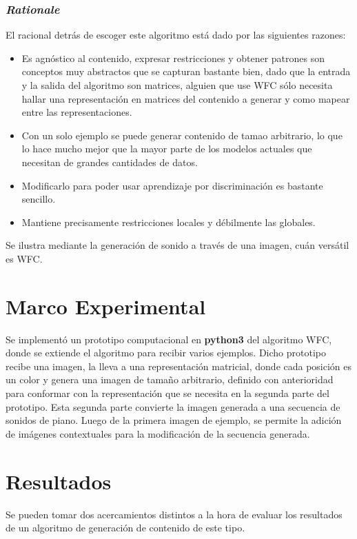 \documentclass[a4paper, 10pt]{article}
\begin{document}
	\subsubsection{\textit{Rationale}}
	El racional detrás de escoger este algoritmo está dado por las siguientes razones:
	\begin{itemize}
		\item Es agnóstico al contenido, expresar restricciones y obtener patrones son conceptos
			muy abstractos que se capturan bastante bien, dado que la entrada y la salida del algoritmo
			son matrices, alguien que use WFC sólo necesita hallar una representación en
			matrices del contenido a generar y como mapear entre las representaciones.
		\item Con un solo ejemplo se puede generar contenido de tamao arbitrario, lo que
			lo hace mucho mejor que la mayor parte de los modelos actuales que necesitan
			de grandes cantidades de datos.
		\item Modificarlo para poder usar aprendizaje por discriminación es bastante sencillo.
		\item Mantiene precisamente restricciones locales y débilmente las globales.
	\end{itemize}

	Se ilustra mediante la generación de sonido a través de una imagen, cuán 
	versátil es WFC.

	\section{Marco Experimental}\label{marco experimental}
	Se implementó un prototipo computacional en \textbf{python3} del algoritmo WFC,
	donde se extiende el algoritmo para recibir varios ejemplos. Dicho prototipo
	recibe una imagen, la lleva a una representación matricial, donde cada posición
	es un color y genera una imagen de tamaño arbitrario, definido con anterioridad
	para conformar con la representación que se necesita en la segunda parte del prototipo.
	Esta segunda parte convierte la imagen generada a una secuencia de sonidos de piano.
	Luego de la primera imagen de ejemplo, se permite la adición de imágenes contextuales
	para la modificación de la secuencia generada.

	\section{Resultados}
	Se pueden tomar dos acercamientos distintos a la hora de evaluar los resultados
	de un algoritmo de generación de contenido de este tipo.
\end{document}
